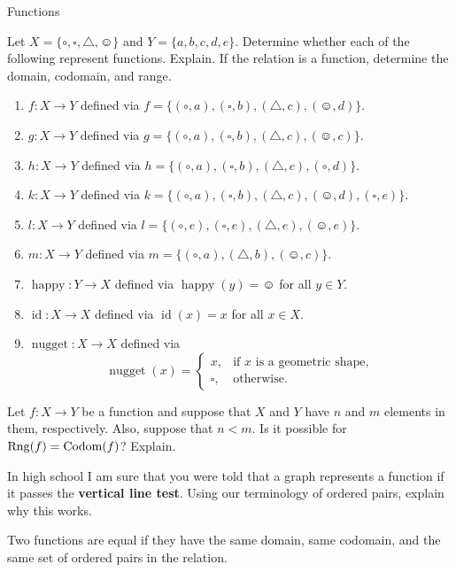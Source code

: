 \begin{section}{Functions}
\begin{exercise}\label{exer:lots}
Let $X=\{\circ, \square,\triangle,\smiley\}$ and $Y=\{a,b,c,d,e\}$.  Determine whether each of the following represent functions.  Explain.  If the relation is a function, determine the domain, codomain, and range.

\begin{enumerate}
\item $f:X\to Y$ defined via $f=\{(\circ, a),(\square,b),(\triangle,c),(\smiley,d)\}$.
\item $g:X\to Y$ defined via $g=\{(\circ, a),(\square,b),(\triangle,c),(\smiley,c)\}$.
\item $h:X\to Y$ defined via $h=\{(\circ, a),(\square,b),(\triangle,c),(\circ,d)\}$.
\item $k:X\to Y$ defined via $k=\{(\circ, a),(\square,b),(\triangle,c),(\smiley,d),(\square,e)\}$.
\item $l:X\to Y$ defined via $l=\{(\circ, e),(\square,e),(\triangle,e),(\smiley,e)\}$.
\item $m:X\to Y$ defined via $m=\{(\circ, a),(\triangle,b),(\smiley,c)\}$.
\item $\operatorname{happy}:Y\to X$ defined via $\operatorname{happy}(y)=\smiley$ for all $y\in Y$.
\item $\operatorname{id}:X\to X$ defined via $\operatorname{id}(x)=x$ for all $x\in X$.
\item $\operatorname{nugget}:X\to X$ defined via 
\[
\operatorname{nugget}(x)=\begin{cases}
x, & \mbox{if } x\mbox{ is a geometric shape},\\
\square, & \mbox{otherwise}.
\end{cases}
\]
\end{enumerate}
\end{exercise}

\begin{exercise}
Let $f:X\to Y$ be a function and suppose that $X$ and $Y$ have $n$ and $m$ elements in them, respectively.  Also, suppose that $n<m$.  Is it possible for $\operatorname{Rng}(f)=\operatorname{Codom}(f)$?  Explain.
\end{exercise}

\begin{exercise}
In high school I am sure that you were told that a graph represents a function if it passes the \textbf{vertical line test}.  Using our terminology of ordered pairs, explain why this works.
\end{exercise}

\begin{definition}
Two functions are equal if they have the same domain, same codomain, and the same set of ordered pairs in the relation.
\end{definition}


\end{section}
